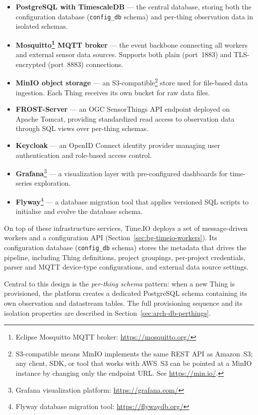 \begin{itemize}
  \item \textbf{PostgreSQL with TimescaleDB} --- the central database, storing both the configuration
        database (\texttt{config\_db} schema) and per-thing observation data in isolated schemas.
  \item \textbf{Mosquitto\footnote{Eclipse Mosquitto MQTT broker: \url{https://mosquitto.org/}} MQTT broker} --- the event backbone connecting all workers and external
        sensor data sources. Supports both plain (port~1883) and TLS-encrypted (port~8883)
        connections.
  \item \textbf{MinIO object storage} --- an S3-compatible\footnote{S3-compatible means MinIO implements the same REST API as Amazon~S3; any client, SDK, or tool that works with AWS~S3 can be pointed at a MinIO instance by changing only the endpoint URL. See \url{https://min.io/}.} store used for file-based data ingestion.
        Each Thing receives its own bucket for raw data files.
  \item \textbf{FROST-Server} --- an OGC SensorThings API endpoint deployed on Apache Tomcat,
        providing standardized read access to observation data through SQL views over per-thing
        schemas.
  \item \textbf{Keycloak} --- an OpenID Connect identity provider managing user authentication
        and role-based access control.
  \item \textbf{Grafana}\footnote{Grafana visualization platform: \url{https://grafana.com/}} --- a visualization layer with pre-configured dashboards for time-series
        exploration.
  \item \textbf{Flyway}\footnote{Flyway database migration tool: \url{https://flywaydb.org/}} --- a database migration tool that applies versioned SQL scripts to
        initialise and evolve the database schema.
\end{itemize}

On top of these infrastructure services, Time.IO deploys a set of message-driven workers
and a configuration API (Section~\ref{sec:bg-timeio-workers}). Its configuration database
(\texttt{config\_db} schema) stores the metadata that drives the pipeline, including Thing
definitions, project groupings, per-project credentials, parser and MQTT device-type
configurations, and external data source settings.

Central to this design is the \emph{per-thing schema} pattern: when a new Thing is provisioned,
the platform creates a dedicated PostgreSQL schema containing its own observation and
datastream tables. The full provisioning sequence and its isolation properties are described
in Section~\ref{sec:arch-db-perthings}.

